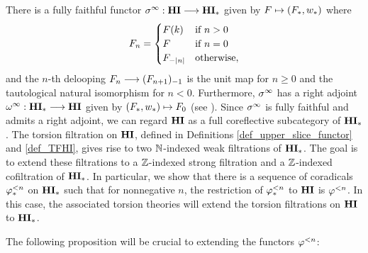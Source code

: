 There is a fully faithful functor $\spectHI: \HI \to \HM$ given
by $F \mapsto (F_*, \deloop_*)$ where
\[
F_n = \begin{cases}
\LHI[k]{F} &\textrm{if }n > 0 \\
F    &\textrm{if }n = 0 \\
\RHI[|n|]F &\textrm{otherwise},
\end{cases}
\]
and the $n$-th delooping $F_n \to \RHI{(F_{n + 1})}$ is the unit map
for $n \geq 0$ and the tautological natural isomorphism for $n < 0$. Furthermore,
$\spectHI$ has a right adjoint $\loopHM: \HM \to \HI$ given by
$(F_*, \deloop_*) \mapsto F_0$ (see \cite[1.18]{DegModHom}).  Since
$\spectHI$ is fully faithful and admits a right adjoint, we can regard
$\HI$ as a full coreflective subcategory of $\HM$. The torsion
filtration on $\HI$, defined in Definitions
\ref{def_upper_slice_functor} and \ref{def_TFHI},
gives rise to two $\N$-indexed weak filtrations of $\HM$. The goal 
is to extend these filtrations to a $\Z$-indexed strong filtration 
and a $\Z$-indexed cofiltration of $\HM$. In particular, we show
that there is a sequence of coradicals $\tlHM{n}$
on $\HM$ such that for nonnegative $n$, the restriction of 
$\tlHM{n}$ to $\HI$ is $\tlHI{n}$. In this case, the associated
torsion theories will extend the torsion 
filtrations on $\HI$ to $\HM$.

The following proposition will be crucial to extending the 
functors $\tlHI{n}$:

